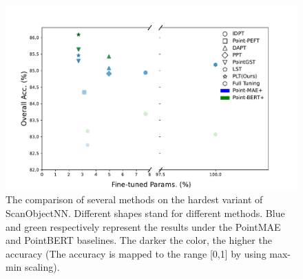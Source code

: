 \begin{figure}
    \centering
    \includegraphics[width=\linewidth]{fig/sota.pdf}
    \caption{The comparison of several methods on the hardest variant of ScanObjectNN\cite{uy2019revisiting}. Different shapes stand for different methods. Blue and green respectively represent the results under the PointMAE\cite{pang2022masked} and PointBERT\cite{yu2022point} baselines. The darker the color, the higher the accuracy (The accuracy is mapped to the range [0,1] by using max-min scaling\cite{panda2014smoothing}).
}
    \label{fig:sota}
\end{figure}